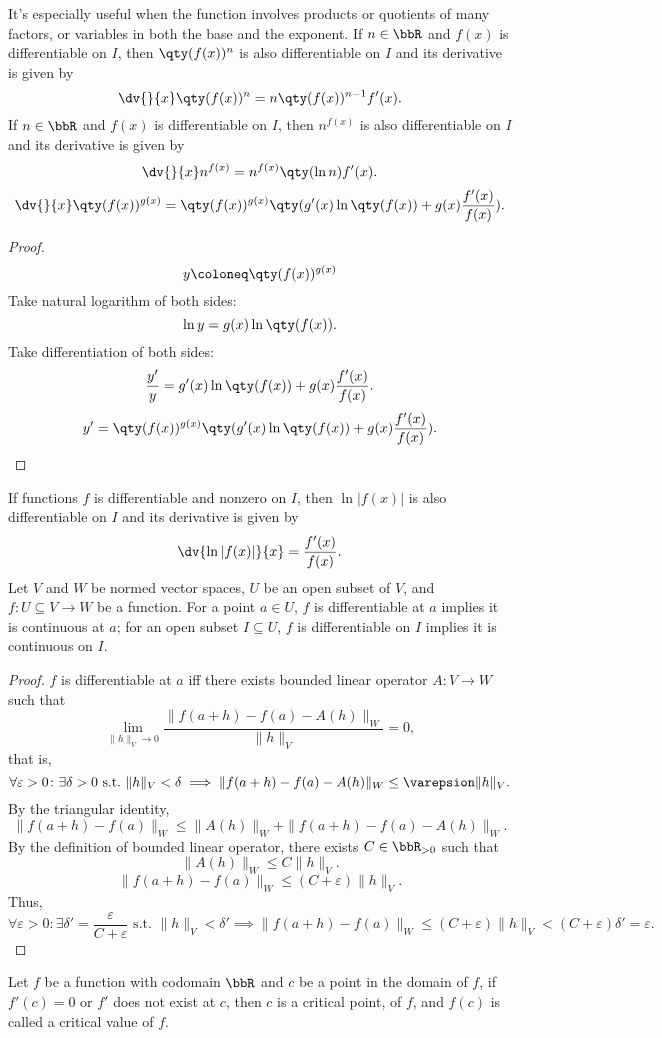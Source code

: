 \documentclass[a4paper,12pt]{report}
\begin{document}
\begin{itemize}
\begin{itemize}
It’s especially useful when the function involves products or quotients of many factors, or variables in both the base and the exponent.
If $n\in\bbR$ and $f(x)$ is differentiable on $I$, then $\qty(f(x))^n$ is also differentiable on $I$ and its derivative is given by
\[\dv{}{x}\qty(f(x))^n=n\qty(f(x))^{n-1}f'(x).\]
If $n\in\bbR$ and $f(x)$ is differentiable on $I$, then $n^{f(x)}$ is also differentiable on $I$ and its derivative is given by
\[\dv{}{x}n^{f(x)}=n^{f(x)}\qty(\ln n)f'(x).\]
\[\dv{}{x}\qty(f(x))^{g(x)}=\qty(f(x))^{g(x)}\qty(g'(x)\ln\qty(f(x))+g(x)\frac{f'(x)}{f(x)}).\]
\begin{proof}
\[y\coloneq\qty(f(x))^{g(x)}\]
Take natural logarithm of both sides:
\[\ln y=g(x)\ln\qty(f(x)).\]
Take differentiation of both sides:
\[\frac{y'}{y}=g'(x)\ln\qty(f(x))+g(x)\frac{f'(x)}{f(x)}.\]
\[y'=\qty(f(x))^{g(x)}\qty(g'(x)\ln\qty(f(x))+g(x)\frac{f'(x)}{f(x)}).\]
\end{proof}
If functions $f$ is differentiable and nonzero on $I$, then $\ln|f(x)|$ is also differentiable on $I$ and its derivative is given by
\[\dv{\ln|f(x)|}{x}=\frac{f'(x)}{f(x)}.\]
Let $V$ and $W$ be normed vector spaces, $U$ be an open subset of $V$, and $f\colon U\subseteq V\to W$ be a function. For a point $a\in U$, $f$ is differentiable at $a$ implies it is continuous at $a$; for an open subset $I\subseteq U$, $f$ is differentiable on $I$ implies it is continuous on $I$.
\begin{proof}
$f$ is differentiable at $a$ iff there exists bounded linear operator $A\colon V\to W$ such that
\[\lim_{\|h\|_V\to 0}\frac{\|f(a+h)-f(a)-A(h)\|_W}{\|h\|_V}=0,\]
that is,
\[\forall\varepsilon>0\colon\exists\delta>0\text{\ s.t.\ }\|h\|_V<\delta\implies\|f(a+h)-f(a)-A(h)\|_W\leq\varepsion\|h\|_V.\]
By the triangular identity,
\[\|f(a+h)-f(a)\|_W\leq\|A(h)\|_W+\|f(a+h)-f(a)-A(h)\|_W.\]
By the definition of bounded linear operator, there exists $C\in\bbR_{>0}$ such that
\[\|A(h)\|_W\leq C\|h\|_V.\]
\[\|f(a+h)-f(a)\|_W\leq (C+\varepsilon)\|h\|_V.\]
Thus,
\[\forall\varepsilon>0\colon\exists\delta'=\frac{\varepsilon}{C+\varepsilon}\text{\ s.t.\ }\|h\|_V<\delta'\implies\|f(a+h)-f(a)\|_W\leq(C+\varepsilon)\|h\|_V<(C+\varepsilon)\delta'=\varepsilon.\]
\end{proof}
Let $f$ be a function with codomain $\bbR$ and \( c \) be a point in the domain of $f$, if \( f'(c) = 0 \) or \( f' \) does not exist at \( c \), then \( c \) is a critical point, of \( f \), and $f(c)$ is called a critical value of $f$.


\end{itemize}
\end{itemize}
\end{document}
